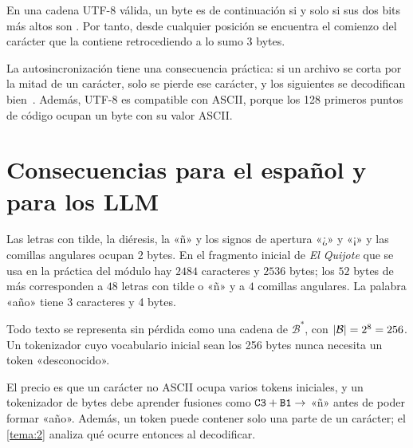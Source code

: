 \begin{proposicion}[Autosincronización]\label{prop:autosinc}
En una cadena UTF-8 válida, un byte es de continuación si y solo si sus dos bits más altos son . Por tanto, desde cualquier posición se encuentra el comienzo del carácter que la contiene retrocediendo a lo sumo 3 bytes.
\end{proposicion}

La autosincronización tiene una consecuencia práctica: si un archivo se corta por la mitad de un carácter, solo se pierde ese carácter, y los siguientes se decodifican bien~\cite[§2.3.2]{jm3}. Además, UTF-8 es compatible con ASCII, porque los 128 primeros puntos de código ocupan un byte con su valor ASCII.

\section{Consecuencias para el español y para los LLM}

\begin{observacion}
Las letras con tilde, la diéresis, la «ñ» y los signos de apertura «¿» y «¡» y las comillas angulares ocupan 2 bytes. En el fragmento inicial de \emph{El Quijote} que se usa en la práctica del módulo hay $2484$ caracteres y $2536$ bytes; los $52$ bytes de más corresponden a $48$ letras con tilde o «ñ» y a $4$ comillas angulares. La palabra «año» tiene 3 caracteres y 4 bytes.
\end{observacion}

\begin{corolario}\label{cor:vocab256}
Todo texto se representa sin pérdida como una cadena de $\mathcal{B}^{*}$, con $\lvert\mathcal{B}\rvert=2^{8}=256$. Un tokenizador cuyo vocabulario inicial sean los 256 bytes nunca necesita un token «desconocido».
\end{corolario}

El precio es que un carácter no ASCII ocupa varios tokens iniciales, y un tokenizador de bytes debe aprender fusiones como $\texttt{C3}+\texttt{B1}\to$ «ñ» antes de poder formar «año». Además, un token puede contener solo una parte de un carácter; el \cref{tema:2} analiza qué ocurre entonces al decodificar.

